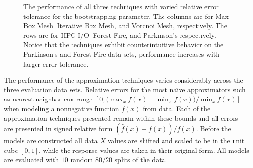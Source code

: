 \begin{figure}[htb]
  \caption{The performance of all three techniques with varied relative error tolerance for the bootstrapping parameter. The columns are for Max Box Mesh, Iterative Box Mesh, and Voronoi Mesh, respectively. The rows are for HPC I/O, Forest Fire, and Parkinson's respectively. Notice that the techniques exhibit counterintuitive behavior on the Parkinson's and Forest Fire data sets, performance increases with larger error tolerance.}
  \label{fig_all_performance}
\end{figure}

The performance of the approximation techniques varies considerably across the three evaluation data sets. Relative errors for the most na\"{\i}ve approximators such as nearest neighbor can range $\displaystyle [0, \big(\max_x f(x) - \min_x f(x)\big) / \min_x f(x) ]$ when modeling a nonnegative function $f(x)$ from data. Each of the approximation techniques presented remain within these bounds and all errors are presented in signed relative form $(\hat f(x) - f(x)) / f(x)$. Before the models are constructed all data $X$ values are shifted and scaled to be in the unit cube $[0,1]$, while the response values are taken in their original form. All models are evaluated with $10$ random $80/20$ splits of the data.

